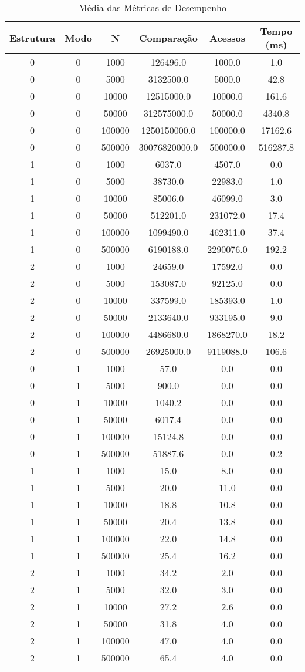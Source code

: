 \begin{table}[htbp]
\caption{Média das Métricas de Desempenho}
\label{tab:table1}
\begin{tabular}{c|c|c|c|c|c}
\textbf{Estrutura} & \textbf{Modo} &\textbf{N} & \textbf{Comparação} & \textbf{Acessos} & \textbf{Tempo (ms)}\\
\hline
0 & 0 & 1000 & 126496.0 & 1000.0 & 1.0\\
0 & 0 & 5000 & 3132500.0 & 5000.0 & 42.8\\
0 & 0 & 10000 & 12515000.0 & 10000.0 & 161.6\\
0 & 0 & 50000 & 312575000.0 & 50000.0 & 4340.8\\
0 & 0 & 100000 & 1250150000.0 & 100000.0 & 17162.6\\
0 & 0 & 500000 & 30076820000.0 & 500000.0 & 516287.8\\
1 & 0 & 1000 & 6037.0 & 4507.0 & 0.0\\
1 & 0 & 5000 & 38730.0 & 22983.0 & 1.0\\
1 & 0 & 10000 & 85006.0 & 46099.0 & 3.0\\
1 & 0 & 50000 & 512201.0 & 231072.0 & 17.4\\
1 & 0 & 100000 & 1099490.0 & 462311.0 & 37.4\\
1 & 0 & 500000 & 6190188.0 & 2290076.0 & 192.2\\
2 & 0 & 1000 & 24659.0 & 17592.0 & 0.0\\
2 & 0 & 5000 & 153087.0 & 92125.0 & 0.0\\
2 & 0 & 10000 & 337599.0 & 185393.0 & 1.0\\
2 & 0 & 50000 & 2133640.0 & 933195.0 & 9.0\\
2 & 0 & 100000 & 4486680.0 & 1868270.0 & 18.2\\
2 & 0 & 500000 & 26925000.0 & 9119088.0 & 106.6\\
0 & 1 & 1000 & 57.0 & 0.0 & 0.0\\
0 & 1 & 5000 & 900.0 & 0.0 & 0.0\\
0 & 1 & 10000 & 1040.2 & 0.0 & 0.0\\
0 & 1 & 50000 & 6017.4 & 0.0 & 0.0\\
0 & 1 & 100000 & 15124.8 & 0.0 & 0.0\\
0 & 1 & 500000 & 51887.6 & 0.0 & 0.2\\
1 & 1 & 1000 & 15.0 & 8.0 & 0.0\\
1 & 1 & 5000 & 20.0 & 11.0 & 0.0\\
1 & 1 & 10000 & 18.8 & 10.8 & 0.0\\
1 & 1 & 50000 & 20.4 & 13.8 & 0.0\\
1 & 1 & 100000 & 22.0 & 14.8 & 0.0\\
1 & 1 & 500000 & 25.4 & 16.2 & 0.0\\
2 & 1 & 1000 & 34.2 & 2.0 & 0.0\\
2 & 1 & 5000 & 32.0 & 3.0 & 0.0\\
2 & 1 & 10000 & 27.2 & 2.6 & 0.0\\
2 & 1 & 50000 & 31.8 & 4.0 & 0.0\\
2 & 1 & 100000 & 47.0 & 4.0 & 0.0\\
2 & 1 & 500000 & 65.4 & 4.0 & 0.0\\
\end{tabular}
\end{table}
